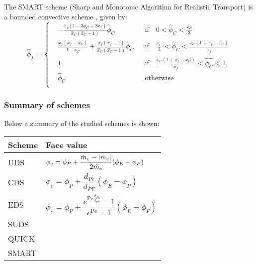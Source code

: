 The SMART scheme (Sharp and Monotonic Algorithm for Realistic Transport) is a bounded convective scheme \cite{gaskell1988curvature}, given by:
\begin{equation}
	\hat{\phi}_f = 
	\left\{
	\begin{aligned}
		&-\frac{\hat{x}_f (1 - 3 \hat{x}_C + 2 \hat{x}_f)}{\hat{x}_C (\hat{x}_C - 1)} \hat{\phi}_C & 
		&\text{if} \quad 0 < \hat{\phi}_C < \frac{\hat{x}_C}{3} \\
		&\frac{\hat{x}_f (\hat{x}_f - \hat{x}_C)}{1 - \hat{x}_C} + \frac{\hat{x}_f (\hat{x}_f - 1)}{\hat{x}_C (\hat{x}_C - 1)} \hat{\phi}_C &
		&\text{if} \quad \frac{\hat{x}_C}{3} < \hat{\phi}_C <  \frac{\hat{x}_C (1 + \hat{x}_f - \hat{x}_C)}{\hat{x}_f} \\
		&1 & &\text{if} \quad \frac{\hat{x}_C (1 + \hat{x}_f - \hat{x}_C)}{\hat{x}_f} < \hat{\phi_C} < 1 \\
		&\hat{\phi}_C & &\text{otherwise} \\
	\end{aligned}
	\right.
\end{equation}

\subsubsection{Summary of schemes}

Below a summary of the studied schemes is shown:

\clearpage

\begin{table}[h]
	\centering
	\begin{tabular}{ll}
		\toprule[0.50mm]
		\textbf{Scheme} & \textbf{Face value} \\
		\midrule[0.25mm]
		UDS & $\phi_e = \phi_P + \dfrac{\dot{m}_e - \abs{\dot{m}_e}}{2 \dot{m}_e} (\phi_E - \phi_P)$ \\ \midrule[0.1mm]
		CDS & $\phi_e = \phi_P + \dfrac{d_{Pe}}{d_{PE}} (\phi_E - \phi_P)$ \\  \midrule[0.1mm]
		EDS & $\phi_e = \phi_P +
		\dfrac{e^{\mathrm{Pe} \frac{d_{Pe}}{d_{PE}}} - 1}{e^{\mathrm{Pe}} - 1} (\phi_E - \phi_P)$ \\  \midrule[0.1mm]
		SUDS & \\  \midrule[0.1mm]
		QUICK & \\  \midrule[0.1mm]
		SMART & \\
		\bottomrule[0.50mm]
	\end{tabular}
\end{table}

